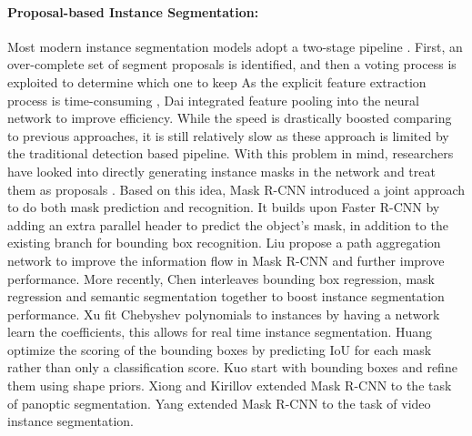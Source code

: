 \documentclass[10pt,twocolumn,letterpaper]{article}
\begin{document}
\paragraph{Proposal-based Instance Segmentation:} 
Most modern instance segmentation models adopt a two-stage pipeline . First, an over-complete set   of segment proposals is identified, and then  a voting process is exploited to determine which one to keep \cite{Chen_2018_CVPR, Dai_2016_CVPR} As the explicit feature extraction process \cite{pont2017multiscale} is time-consuming \cite{hariharan2014simultaneous,hariharan2015hypercolumns}, Dai \etal \cite{dai2015convolutional,dai2016instance} integrated feature pooling into the neural network to improve  efficiency. While the speed is drastically boosted comparing to  previous approaches, it is still relatively slow as these approach is limited by the traditional detection based pipeline. With this problem in mind, researchers have looked into directly generating instance masks in the network and treat them as proposals \cite{pinheiro2015learning,pinheiro2016learning}. Based on this idea, Mask R-CNN \cite{mask-rcnn} introduced a joint approach to do both mask prediction and recognition. It builds upon Faster R-CNN \cite{ren2015faster} by adding an extra parallel header to predict the object's mask, in addition to the existing branch for bounding box recognition. Liu \etal \cite{panet} propose a path aggregation network to improve the information flow in Mask R-CNN  and further improve performance. More recently, Chen \etal  \cite{Chen_2019_CVPR} interleaves bounding box regression, mask regression and semantic segmentation together to boost instance segmentation performance. Xu \etal \cite{Xu_2019_ICCV} fit Chebyshev polynomials to instances by having a network learn the coefficients, this allows for real time instance segmentation. Huang \etal \cite{huang2019msrcnn} optimize the scoring of the bounding boxes by predicting IoU for each mask rather than only a classification score. Kuo \etal \cite{Kuo_2019_ICCV} start with bounding boxes and refine them using shape priors. Xiong \etal \cite{upsnet} and Kirillov \etal \cite{Kirillov_2019_CVPR} extended Mask R-CNN to the task of panoptic segmentation. Yang \etal \cite{Yang_2019_ICCV} extended Mask R-CNN to the task of video instance segmentation. 







\vspace{-0.2cm}
\end{document}
